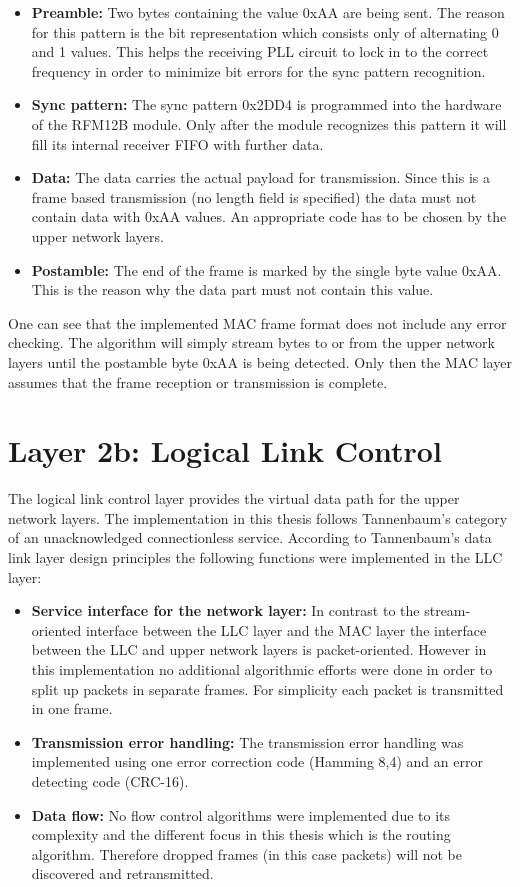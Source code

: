 \begin{itemize}
\item \textbf{Preamble:} Two bytes containing the value 0xAA are being sent. The reason for this pattern is the bit representation which consists only of alternating 0 and 1 values. This helps the receiving PLL circuit to lock in to the correct frequency in order to minimize bit errors for the sync pattern recognition.
\item \textbf{Sync pattern:} The sync pattern 0x2DD4 is programmed into the hardware of the RFM12B module. Only after the module recognizes this pattern it will fill its internal receiver FIFO with further data.
\item \textbf{Data:} The data carries the actual payload for transmission. Since this is a frame based transmission (no length field is specified) the data must not contain data with 0xAA values. An appropriate code has to be chosen by the upper network layers.
\item \textbf{Postamble:} The end of the frame is marked by the single byte value 0xAA. This is the reason why the data part must not contain this value.
\end{itemize}

One can see that the implemented MAC frame format does not include any error checking. The algorithm will simply stream bytes to or from the upper network layers until the postamble byte 0xAA is being detected. Only then the MAC layer assumes that the frame reception or transmission is complete.

\section{Layer 2b: Logical Link Control}
The logical link control layer provides the virtual data path for the upper network layers. The implementation in this thesis follows Tannenbaum's \cite{tannenbaum} category of an unacknowledged connectionless service. According to Tannenbaum's data link layer design principles the following functions were implemented in the LLC layer:

\begin{itemize}
\item \textbf{Service interface for the network layer:} In contrast to the stream-oriented interface between the LLC layer and the MAC layer the interface between the LLC and upper network layers is packet-oriented. However in this implementation no additional algorithmic efforts were done in order to split up packets in separate frames. For simplicity each packet is transmitted in one frame.
\item \textbf{Transmission error handling:} The transmission error handling was implemented using one error correction code (Hamming 8,4) and an error detecting code (CRC-16).
\item \textbf{Data flow:} No flow control algorithms were implemented due to its complexity and the different focus in this thesis which is the routing algorithm. Therefore dropped frames (in this case packets) will not be discovered and retransmitted.
\end{itemize}


